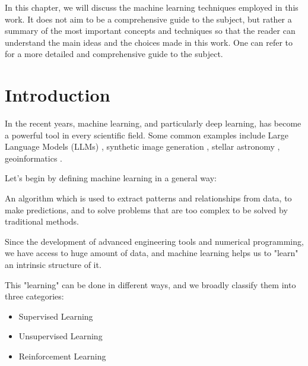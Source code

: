 
In this chapter, we will discuss the machine learning techniques employed in this work. It does not aim to be a comprehensive guide to the subject, but rather a summary of the most important concepts and techniques so that the reader can understand the main ideas and the choices made in this work. One can refer to \cite{pml1Book} for a more detailed and comprehensive guide to the subject.

\section{Introduction}
In the recent years, machine learning, and particularly deep learning, has become a powerful tool in every scientific field. Some common examples include Large Language Models (LLMs) \cite{radford2019language,touvron2023llamaopenefficientfoundation}, synthetic image generation \cite{ho2020denoisingdiffusionprobabilisticmodels}, stellar astronomy \cite{ostdiek_b_cataloging_2020}, geoinformatics \cite{robin2022learningforecastvegetationgreenness}.

Let's begin by defining machine learning in a general way:

\begin{tcolorbox}[colback=red!5!white, colframe=red!75!black]
    An algorithm which is used to extract patterns and relationships from data, to make predictions, and to solve problems that are too complex to be solved by traditional methods.
\end{tcolorbox}

Since the development of advanced engineering tools and numerical programming, we have access to huge amount of data, and machine learning helps us to "learn" an intrinsic structure of it. 

This "learning" can be done in different ways, and we broadly classify them into three categories:
\begin{itemize}
    \item Supervised Learning
    \item Unsupervised Learning
    \item Reinforcement Learning
\end{itemize}

